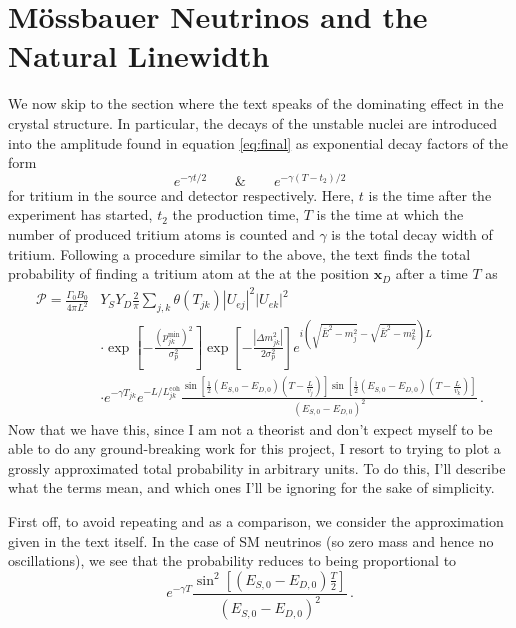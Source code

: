\documentclass[10pt]{article}
\begin{document}
\section{M\"{o}ssbauer Neutrinos and the Natural Linewidth}

We now skip to the section where the text \cite{Akhmedov_2008} speaks of the dominating effect in the crystal structure. In particular, the decays of the unstable nuclei are introduced into the amplitude found in equation \ref{eq:final} as exponential decay factors of the form
\begin{equation}
  e^{-\gamma t/2} \hspace{2em} \& \hspace{2em} e^{-\gamma(T-t_{2})/2}
\end{equation}
for tritium in the source and detector respectively. Here, $t$ is the time after the experiment has started, $t_{2}$ the production time, $T$ is the time at which the number of produced tritium atoms is counted and $\gamma$ is the total decay width of tritium. Following a procedure similar to the above, the text finds the total probability of finding a tritium atom at the at the position $\bm{x}_{D}$ after a time $T$ as
\begin{equation}\label{eq:prob_before}
  \begin{split}
    \mathcal{P} = \frac{\Gamma_{0}B_{0}}{4\pi L^{2}} & Y_{S}Y_{D}\frac{2}{\pi}\sum_{j,k}\theta(T_{jk})|U_{ej}|^{2}|U_{ek}|^{2} \\
    & \cdot \exp\left[-\frac{(p_{jk}^{\text{min}})^{2}}{\sigma_{p}^{2}}\right]\exp\left[-\frac{|\Delta m_{jk}^{2}|}{2\sigma^{2}_{p}}\right]e^{i\left(\sqrt{\bar{E}^{2} - m_{j}^{2}} - \sqrt{\bar{E}^{2} - m_{k}^{2}}\right)L} \\
    & \cdot e^{-\gamma T_{jk}}e^{-L/L_{jk}^{\text{coh}}}\frac{\sin\left[\frac{1}{2}(E_{S,0} - E_{D,0})(T - \frac{L}{v_{j}})\right]\sin\left[\frac{1}{2}(E_{S,0} - E_{D,0})(T - \frac{L}{v_{k}})\right]}{(E_{S,0} - E_{D,0})^{2}}\, .
  \end{split}
\end{equation}
Now that we have this, since I am not a theorist and don't expect myself to be able to do any ground-breaking work for this project, I resort to trying to plot a grossly approximated total probability in arbitrary units. To do this, I'll describe what the terms mean, and which ones I'll be ignoring for the sake of simplicity.

First off, to avoid repeating and as a comparison, we consider the approximation given in the text itself. In the case of SM neutrinos (so zero mass and hence no oscillations), we see that the probability reduces to being proportional to
\begin{equation}
  e^{-\gamma T}\frac{\sin^{2}[(E_{S,0} - E_{D,0})\frac{T}{2}]}{(E_{S,0} - E_{D,0})^{2}}\, .
\end{equation}
\end{document}
